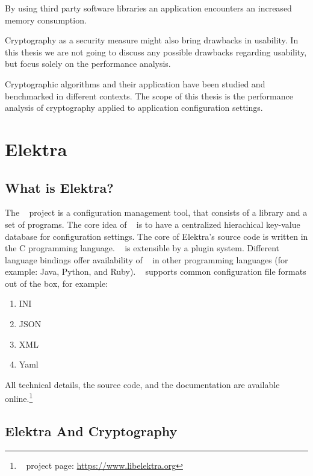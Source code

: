 By using third party software libraries an application encounters an increased memory consumption.

\label{intro-hypo-2}

Cryptography as a security measure might also bring drawbacks in usability.
In this thesis we are not going to discuss any possible drawbacks regarding usability, but focus solely on the performance analysis.

Cryptographic algorithms and their application have been studied and benchmarked in different contexts.\cite{ocf,freebsdtls,thakur2011aes}
The scope of this thesis is the performance analysis of cryptography applied to application configuration settings.

\section{Elektra}

	\subsection{What is Elektra?}

The \elektra~ project is a configuration management tool, that consists of a library and a set of programs.
The core idea of \elektra~ is to have a centralized hierachical key-value database for configuration settings.
The core of Elektra's source code is written in the C programming language.
\elektra~ is extensible by a plugin system.
Different language bindings offer availability of \elektra~ in other programming languages (for example: Java, Python, and Ruby).
\elektra~ supports common configuration file formats out of the box, for example:\cite{elektra-doc,raab2010thesis}
\begin{enumerate}
\item INI
\item JSON
\item XML
\item Yaml
\end{enumerate}

All technical details, the source code, and the documentation are available online.\footnote{\elektra~ project page: \url{https://www.libelektra.org}}

	\subsection{Elektra And Cryptography}

